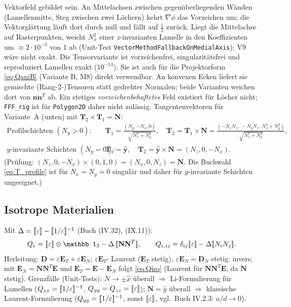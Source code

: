 Vektorfeld gebildet sein. An Mittelachsen zwischen gegenüberliegenden Wänden (Lamellenmitte, Steg zwischen zwei
Löchern) kehrt $\nabla\phi$ das Vorzeichen um; die Vektorglättung läuft dort durch null und fällt auf $\tfrac12$
zurück. Liegt die Mittelachse auf Rasterpunkten, weicht $N_x^2$ einer $z$-invarianten Lamelle in den Koeffizienten um
$\approx2\cdot10^{-3}$ von 1 ab (Unit-Test \texttt{VectorMethodFallbackOnMedialAxis}); V9 wäre nicht exakt. Die
Tensorvariante ist vorzeichenfrei, singularitätsfrei und reproduziert Lamellen exakt ($10^{-14}$). Sie ist
auch für die Projektorform \eqref{eq:QaniB} (Variante B, M8) direkt verwendbar. An konvexen Ecken liefert sie
gemischte (Rang-2-)Tensoren statt gedrehter Normalen; beide Varianten weichen dort von $\mathbf n\mathbf n^T$ ab.
Ein stetiges \emph{vorzeichenbehaftetes} Feld existiert für Löcher nicht; \texttt{FFF\_rig} ist für
\texttt{Polygon2D} daher nicht zulässig.
Tangentenvektoren für Variante~A (unten) mit $\mathbf T_2\times\mathbf T_1=\mathbf N$:
\begin{align}
  \text{Profilschichten }(N_y>0):\quad&\mathbf T_1=\frac{(N_y,-N_x,0)}{\sqrt{N_x^2+N_y^2}},\quad
  \mathbf T_2=\mathbf T_1\times\mathbf N=\frac{(-N_xN_z,\,-N_yN_z,\,N_x^2+N_y^2)}{\sqrt{N_x^2+N_y^2}},\label{eq:T_profile}\\
  \text{$y$-invariante Schichten }(N_y=0):\quad&\mathbf T_1=\hat{\mathbf y},\quad \mathbf T_2=\hat{\mathbf y}\times\mathbf N=(N_z,0,-N_x).\label{eq:T_yinv}
\end{align}
(Prüfung: $(N_z,0,-N_x)\times(0,1,0)=(N_x,0,N_z)=\mathbf N$. Die Buchwahl \eqref{eq:T_profile} ist für
$N_x=N_y=0$ singulär und daher für $y$-invariante Schichten ungeeignet.)

\subsection{Isotrope Materialien}
Mit $\Delta=[\![\varepsilon]\!]-[\![1/\varepsilon]\!]^{-1}$ (Buch (IV.32), (IX.11)):
\begin{equation}
  Q_{\varepsilon}=\tp{\varepsilon}\otimes\mathbb 1_3-\Delta\,\tp{\mathbf N\mathbf N^T},\qquad
  Q_{\varepsilon,ij}=\delta_{ij}\tp{\varepsilon}-\Delta\tp{N_iN_j}.
  \label{eq:Qiso}
\end{equation}
Herleitung: $\mathbf D=\varepsilon\mathbf E_T+\varepsilon\mathbf E_N$; $\varepsilon\mathbf E_T$: Laurent
($\mathbf E_T$ stetig), $\varepsilon\mathbf E_N=\mathbf D_N$ stetig: invers; mit $\mathbf E_N=\mathbf N\mathbf N^T\mathbf E$
und $\mathbf E_T=\mathbf E-\mathbf E_N$ folgt \eqref{eq:Qiso} (Laurent für $\mathbf N\mathbf N^T\mathbf E$, da $\mathbf N$ stetig).
Grenzfälle (Unit-Tests): $N\to\pm\hat x$ überall $\Rightarrow$ Li-Formulierung für Lamellen
($Q_{xx}=[\![1/\varepsilon]\!]^{-1}$, $Q_{yy}=Q_{zz}=[\![\varepsilon]\!]$); $\mathbf N=\hat y$ überall $\Rightarrow$ klassische Laurent-Formulierung
($Q_{yy}=[\![1/\varepsilon]\!]^{-1}$, sonst $[\![\varepsilon]\!]$, vgl.\ Buch IV.2.3: $a/d\to0$).

